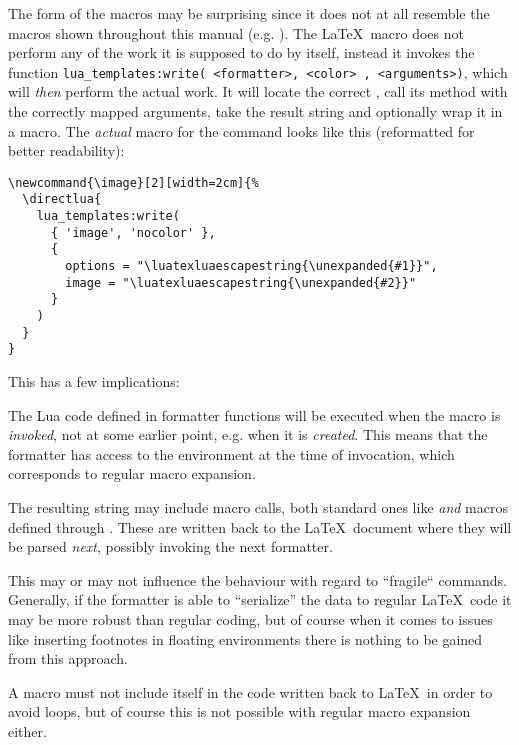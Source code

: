 \documentclass[12pt]{scrartcl}
\begin{document}
The form of the macros may be surprising since it does not at all resemble the
macros shown throughout this manual (e.g. ).  The
\LaTeX\ macro does not perform any of the work it is supposed to do by itself,
instead it invokes the function \texttt{lua_templates:write({
<formatter>, <color> }, <arguments>)}, which will \emph{then} perform the actual
work.  It will locate the correct , call its 
method with the correctly mapped arguments, take the result string and
optionally wrap it in a  macro.  The \emph{actual} macro for the  command looks like this (reformatted for better readability):

\begin{verbatim}
\newcommand{\image}[2][width=2cm]{%
  \directlua{
    lua_templates:write(
      { 'image', 'nocolor' },
      {
        options = "\luatexluaescapestring{\unexpanded{#1}}",
        image = "\luatexluaescapestring{\unexpanded{#2}}"
      }
    )
  }
}
\end{verbatim}

\noindent This has a few implications:

\begin{itemize*}
\item The Lua code defined in formatter functions will be executed when the
macro is \emph{invoked}, not at some earlier point, e.g. when it is
\emph{created}.  This means that the formatter has access to the environment at
the time of invocation, which corresponds to regular macro expansion.
\item The resulting string may include macro calls, both standard ones like
 \emph{and} macros defined through .  These are
written back to the \LaTeX\ document where they will be parsed \emph{next},
possibly invoking the next  formatter.
\item This may or may not influence the behaviour with regard to “fragile“
commands.  Generally, if the formatter is able to “serialize” the data to
regular \LaTeX\ code it may be more robust than regular coding, but of course
when it comes to issues like inserting footnotes in floating environments there
is nothing to be gained from this approach.
\item A  macro must not include itself in the code
written back to \LaTeX\ in order to avoid loops, but of course this is not
possible with regular macro expansion either.
\end{itemize*}
\end{document}
